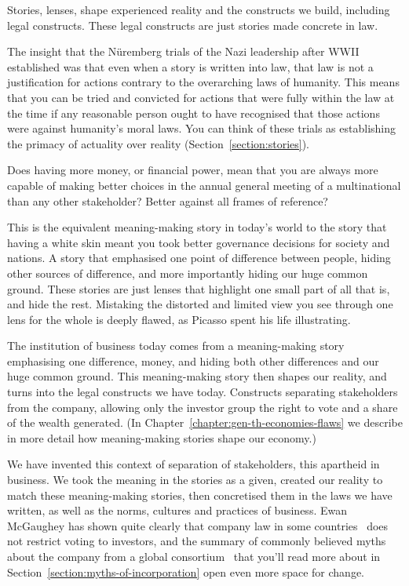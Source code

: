 Stories, lenses, shape experienced reality and the constructs we build, including legal constructs. These legal constructs are just stories made concrete in law. 


The insight that the N{\"u}remberg trials of the Nazi leadership after WWII established was that even when a story is written into law, that law is not a justification for actions contrary to the overarching laws of humanity. This means that you can be tried and convicted for actions that were fully within the law at the time if any reasonable person ought to have recognised that those actions were against humanity's moral laws. You can think of these trials as establishing the primacy of actuality over reality (Section~\ref{section:stories}).


Does having more money, or financial power, mean that you are always more capable of making better choices in the annual general meeting of a multinational than any other stakeholder? Better against all frames of reference?


This is the equivalent meaning\hyp{}making story in today's world to the story that having a white skin meant you took better governance decisions for society and nations. A story that emphasised one point of difference between people, hiding other sources of difference, and more importantly hiding our huge common ground. These stories are just lenses that highlight one small part of all that is, and hide the rest. Mistaking the distorted and limited view you see through one lens for the whole is deeply flawed, as Picasso spent his life illustrating. 


The institution of business today comes from a meaning\hyp{}making story emphasising one difference, money, and hiding both other differences and our huge common ground. This meaning\hyp{}making story then shapes our reality, and turns into the legal constructs we have today. Constructs separating stakeholders from the company, allowing only the investor group the right to vote and a share of the wealth generated. (In Chapter~\ref{chapter:gen-th-economies-flaws} we describe in more detail how meaning\hyp{}making stories shape our economy.)


We have invented this context of separation of stakeholders, this apartheid in business. We took the meaning in the stories as a given, created our reality to match these meaning\hyp{}making stories, then concretised them in the laws we have written, as well as the norms, cultures and practices of business. Ewan McGaughey has shown quite clearly that company law in some countries~\cite{mcgaughey} does not restrict voting to investors, and the summary of commonly believed myths about the company from a global consortium~\cite{veldman-modern-economics} that you’ll read more about in Section~\ref{section:myths-of-incorporation} open even more space for change. 


